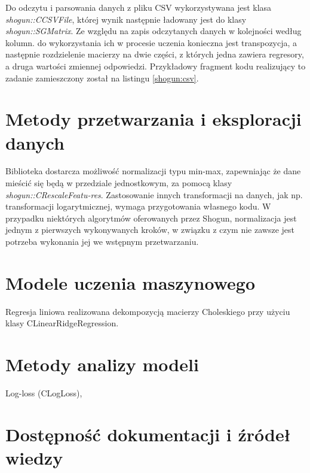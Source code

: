 Do odczytu i parsowania danych z pliku CSV wykorzystywana jest klasa \textit{shogun::CCSVFile}, której wynik następnie ładowany jest do klasy \textit{shogun::SGMatrix}. Ze względu na zapis odczytanych danych w kolejności według kolumn. do wykorzystania ich w procesie uczenia konieczna jest transpozycja, a następnie rozdzielenie macierzy na dwie części, z których jedna zawiera regresory, a druga wartości zmiennej odpowiedzi. Przykładowy fragment kodu realizujący to zadanie zamieszczony został na listingu \ref{shogun:csv}.


\section{Metody przetwarzania i eksploracji danych}
     
Biblioteka dostarcza możliwość normalizacji typu min-max, zapewniając że dane mieścić się będą w przedziale jednostkowym, za pomocą klasy \textit{shogun::CRescaleFeatu-res}. Zastosowanie innych transformacji na danych, jak np. transformacji logarytmicznej, wymaga przygotowania własnego kodu. W przypadku niektórych algorytmów oferowanych przez Shogun, normalizacja jest jednym z pierwszych wykonywanych kroków, w związku z czym nie zawsze jest potrzeba wykonania jej we wstępnym przetwarzaniu.

\section{Modele uczenia maszynowego}

Regresja liniowa realizowana dekompozycją macierzy Choleskiego przy użyciu klasy CLinearRidgeRegression.

\section{Metody analizy modeli}

Log-loss (CLogLoss), 

\section{Dostępność dokumentacji i źródeł wiedzy}

